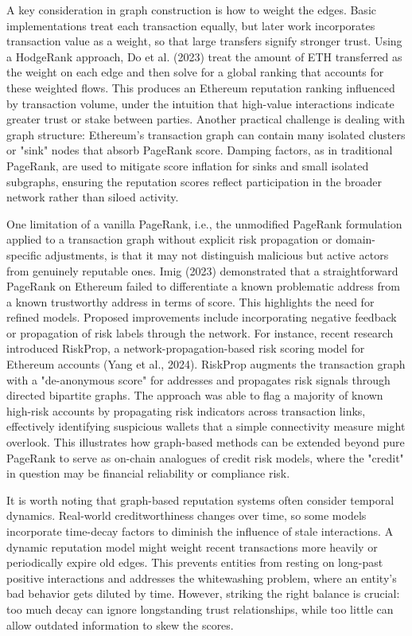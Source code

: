 A key consideration in graph construction is how to weight the edges. Basic implementations treat each transaction equally, but later work incorporates transaction value as a weight, so that large transfers signify stronger trust. Using a HodgeRank approach, Do et al. (2023) treat the amount of ETH transferred as the weight on each edge and then solve for a global ranking that accounts for these weighted flows. This produces an Ethereum reputation ranking influenced by transaction volume, under the intuition that high-value interactions indicate greater trust or stake between parties. Another practical challenge is dealing with graph structure: Ethereum's transaction graph can contain many isolated clusters or "sink" nodes that absorb PageRank score. Damping factors, as in traditional PageRank, are used to mitigate score inflation for sinks and small isolated subgraphs, ensuring the reputation scores reflect participation in the broader network rather than siloed activity.


One limitation of a vanilla PageRank, i.e., the unmodified PageRank formulation applied to a transaction graph without explicit risk propagation or domain-specific adjustments, is that it may not distinguish malicious but active actors from genuinely reputable ones. Imig (2023) demonstrated that a straightforward PageRank on Ethereum failed to differentiate a known problematic address from a known trustworthy address in terms of score. This highlights the need for refined models. Proposed improvements include incorporating negative feedback or propagation of risk labels through the network. For instance, recent research introduced RiskProp, a network-propagation-based risk scoring model for Ethereum accounts (Yang et al., 2024). RiskProp augments the transaction graph with a "de-anonymous score" for addresses and propagates risk signals through directed bipartite graphs. The approach was able to flag a majority of known high-risk accounts by propagating risk indicators across transaction links, effectively identifying suspicious wallets that a simple connectivity measure might overlook. This illustrates how graph-based methods can be extended beyond pure PageRank to serve as on-chain analogues of credit risk models, where the "credit" in question may be financial reliability or compliance risk.


It is worth noting that graph-based reputation systems often consider temporal dynamics. Real-world creditworthiness changes over time, so some models incorporate time-decay factors to diminish the influence of stale interactions. A dynamic reputation model might weight recent transactions more heavily or periodically expire old edges. This prevents entities from resting on long-past positive interactions and addresses the whitewashing problem, where an entity's bad behavior gets diluted by time. However, striking the right balance is crucial: too much decay can ignore longstanding trust relationships, while too little can allow outdated information to skew the scores.


